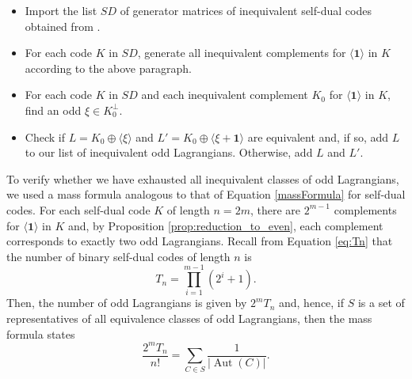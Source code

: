 \documentclass[a4paper,reqno]{amsart}
\DeclareMathOperator{\Aut}{\mathrm{Aut}}%
\theoremstyle{definition}
\theoremstyle{remark} \newtheorem{remark}[theorem]{Remark}
\numberwithin{equation}{section}
\begin{document}
\begin{itemize}
    \item Import the list \(SD\) of generator matrices of inequivalent self-dual codes obtained from \cite{database}.
    \item For each code \(K\) in \(SD\), generate all inequivalent complements for \(\langle \mathbf{1} \rangle\) in \(K\) according to the above paragraph.
    \item For each code \(K\) in \(SD\) and each inequivalent complement \(K_0\) for \(\langle \mathbf{1} \rangle\) in \(K\), find an odd \(\xi \in K_0^\perp\).
    \item Check if \(L = K_0 \oplus \langle \xi \rangle\) and \(L' = K_0 \oplus \langle \xi + \mathbf{1}\rangle\) are equivalent and, if so, add \(L\) to our list of inequivalent odd Lagrangians. Otherwise, add \(L\) and \(L'\).
\end{itemize}

To verify whether we have exhausted all inequivalent classes of odd Lagrangians, we used a mass formula analogous to that of Equation \eqref{massFormula} for self-dual codes. For each self-dual code \(K\) of length \(n = 2m\), there are \(2^{m-1}\) complements for \(\langle \mathbf{1} \rangle\) in \(K\) and, by Proposition \ref{prop:reduction_to_even}, each complement corresponds to exactly two odd Lagrangians. Recall from Equation \eqref{eq:Tn} that the number of binary self-dual codes of length \(n\) is
\begin{equation*}
    T_{n} = \prod_{i=1}^{m-1}(2^i + 1).
\end{equation*}
Then, the number of odd Lagrangians is given by \(2^mT_n\) and, hence, if \(S\) is a set of representatives of all equivalence classes of odd Lagrangians, then the mass formula states
\begin{equation*}
    \frac{2^mT_n}{n!} = \sum_{C \in S} \frac{1}{\lvert \Aut(C)\rvert}.
\end{equation*}

\end{document}
